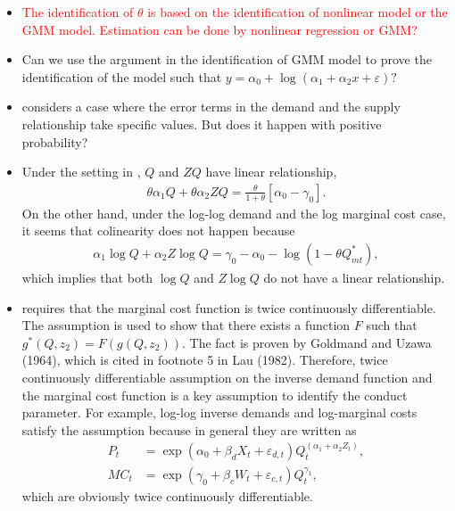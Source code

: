 \documentclass[11pt, a4paper]{article}
\begin{document}
    \begin{itemize}
        \item \textcolor{red}{ The identification of $\theta$ is based on the identification of nonlinear model or the GMM model. Estimation can be done by nonlinear regression or GMM?}
        \item Can we use the argument in the identification of GMM model to prove the identification of the model such that  $y = \alpha_0 + \log(\alpha_1 + \alpha_2 x +\varepsilon)?$
        \item \cite{perloff2012collinearity} considers a case where the error terms in the demand and the supply relationship take specific values. But does it happen with positive probability?  
        \item Under the setting in \cite{perloff2012collinearity}, $Q$ and $ZQ$ have linear relationship, 
        \begin{align*}
            \theta \alpha_1 Q + \theta \alpha_2 ZQ = \frac{\theta}{1 + \theta} [\alpha_0 - \gamma_0].
        \end{align*}
        On the other hand, under the log-log demand and the log marginal cost case, it seems that colinearity does not happen because 
        \begin{align*}
            \alpha_1 \log Q + \alpha_2 Z\log Q = \gamma_0 - \alpha_0 -  \log \left(  1 - \theta Q^*_{mt} \right),
        \end{align*}
        which implies that both $\log Q$ and $Z\log Q$ do not have a linear relationship.
        \item \cite{lau1982identifying} requires that the marginal cost function is twice continuously differentiable. The assumption is used to show that there exists a function $F$ such that $g^*(Q,z_2) = F(g(Q,z_2))$. The fact is proven by Goldmand and Uzawa (1964), which is cited in footnote 5 in Lau (1982). Therefore, twice continuously differentiable assumption on the inverse demand function and the marginal cost function is a key assumption to identify the conduct parameter. For example, log-log inverse demands and log-marginal costs satisfy the assumption because in general they are written as 
        \begin{align*}
            P_t &= \exp(\alpha_0+\beta_d X_t + \varepsilon_{d,t})Q_t^{(\alpha_1 + \alpha_2 Z_t)},\\
            MC_t &= \exp(\gamma_0+\beta_c W_t + \varepsilon_{c,t})Q_t^{\gamma_1},
        \end{align*}
        which are obviously twice continuously differentiable. 

\end{itemize}
\end{document}
